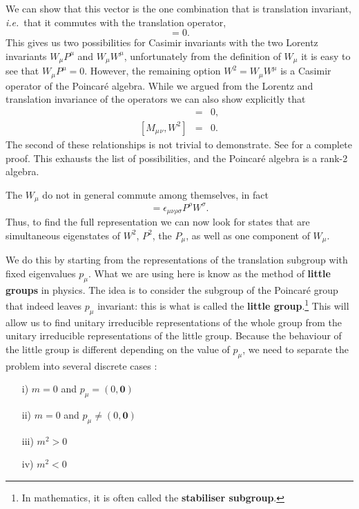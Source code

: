 \documentclass[notes.tex]{subfiles}
\begin{document}
We can show that this vector is the one combination that is translation invariant, {\it i.e.}\ that it commutes with the translation operator,
\begin{equation}
[P_\mu, W_\nu]=0.
\label{eq:PW_commutator}
\end{equation}
This gives us two possibilities for Casimir invariants with the two Lorentz invariants $W_\mu P^\mu$ and $W_\mu W^\mu$, unfortunately from the definition of $W_\mu$ it is easy to see that  $W_\mu P^\mu=0$. However, the remaining option $W^2 = W_\mu W^\mu$ is a Casimir operator of the Poincaré algebra. While we argued from the Lorentz and translation invariance of the operators we can also show explicitly that
\begin{eqnarray}
[P_\mu, W^2] &=& 0,\\
{[M_\mu{}_\nu, W^2]} &=& 0.
\end{eqnarray}
The second of these relationships is not trivial to demonstrate. See \cite{IntrSUSY2010} for a complete proof. This exhausts the list of possibilities, and the Poincaré algebra is a rank-2 algebra. 

The $W_\mu$ do not in general commute among themselves, in fact 
\begin{equation}
[W_\mu,W_\nu]=\epsilon_{\mu\nu\rho\sigma}P^\rho W^\sigma.
\label{eq:WW_commutator}
\end{equation}
Thus, to find the full representation we can now look for states that are simultaneous eigenstates of $W^2$, $P^2$, the $P_\mu$, as well as one component of $W_\mu$.  

We do this by starting from the representations of the translation subgroup with fixed eigenvalues $p_\mu$. What we are using here is know as the method of {\bf little groups} in physics. The idea is to consider the subgroup of the Poincaré group that indeed leaves $p_\mu$ invariant: this is what is called the {\bf little group}.\footnote{In mathematics, it is often called the {\bf stabiliser subgroup}.}  This will allow us to find unitary irreducible representations of the whole group from the unitary irreducible representations of the little group.  Because the behaviour of the little group is different depending on the value of $p_\mu$, we need to separate the problem into several discrete cases :
\begin{itemize}
\item[i)] $m=0$ and $p_\mu=(0,\mathbf 0)$
\item[ii)] $m=0$ and $p_\mu\neq(0,\mathbf 0)$
\item[iii)] $m^2>0$
\item[iv)] $m^2<0$
\end{itemize}
\end{document}
